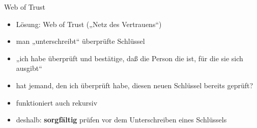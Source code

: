 \begin{frame}{Web of Trust}
  \begin{itemize}
    \item Lösung: Web of Trust („Netz des Vertrauens“)
    \item man „unterschreibt“ überprüfte Schlüssel
    \item „ich habe überprüft und bestätige, daß die Person die ist, für die sie
      sich ausgibt“
    \item hat jemand, den ich überprüft habe, diesen neuen Schlüssel bereits
      geprüft?
    \item funktioniert auch rekursiv
    \item deshalb: \textbf{sorgfältig} prüfen vor dem Unterschreiben eines
      Schlüssels
  \end{itemize}

\end{frame}
